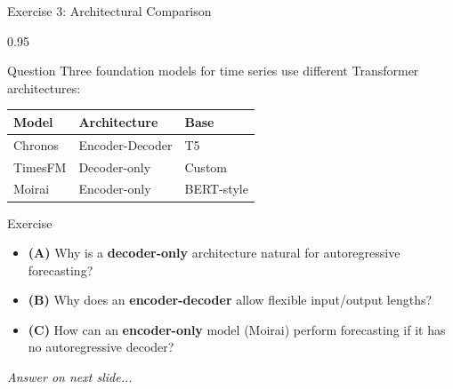 \documentclass[9pt, aspectratio=169, t]{beamer}
\begin{document}
\begin{frame}{Exercise 3: Architectural Comparison}
    \begin{cminipage}{0.95\textwidth}
    {\small
    \begin{alertblock}{Question}
        Three foundation models for time series use different Transformer architectures:
        \begin{center}
        {\footnotesize
        \begin{tabular}{lll}
            \toprule
            \textbf{Model} & \textbf{Architecture} & \textbf{Base} \\
            \midrule
            Chronos & Encoder-Decoder & T5 \\
            TimesFM & Decoder-only & Custom \\
            Moirai  & Encoder-only  & BERT-style \\
            \bottomrule
        \end{tabular}
        }
        \end{center}
    \end{alertblock}

    \vspace{0.1cm}

    \begin{block}{Exercise}
        \begin{itemize}\setlength{\itemsep}{3pt}
            \item \textcolor{MainBlue}{\textbf{(A)}} Why is a \textbf{decoder-only} architecture natural for autoregressive forecasting?
            \item \textcolor{MainBlue}{\textbf{(B)}} Why does an \textbf{encoder-decoder} allow flexible input/output lengths?
            \item \textcolor{MainBlue}{\textbf{(C)}} How can an \textbf{encoder-only} model (Moirai) perform forecasting if it has no autoregressive decoder?
        \end{itemize}
    \end{block}

    \vspace{0.1cm}

    \begin{center}
        \textit{Answer on next slide...}
    \end{center}
    }
    \end{cminipage}
\end{frame}
\end{document}
